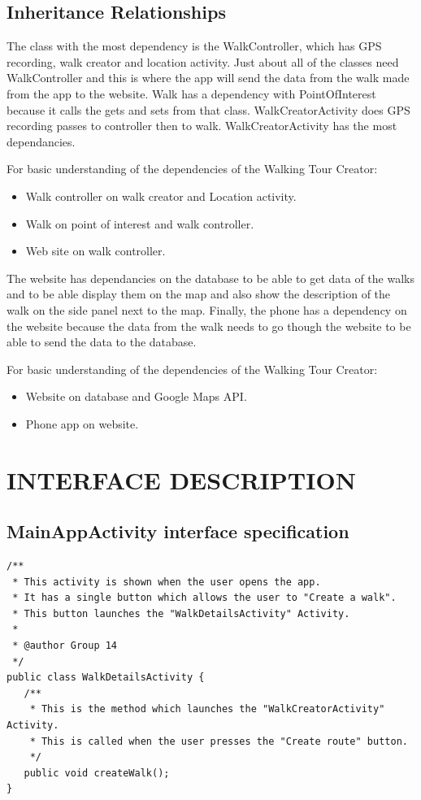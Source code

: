\documentclass{project}
\begin{document}
\newpage

\subsection{Inheritance Relationships}
The class with the most dependency is the WalkController, which has GPS
recording, walk creator and location activity. Just about all of the classes
need WalkController and this is where the app will send the data from the walk
made from the app to the website. Walk has a dependency with PointOfInterest
because it calls the gets and sets from that class. WalkCreatorActivity does GPS recording passes to controller then to walk. WalkCreatorActivity has the most dependancies.

For basic understanding of the dependencies of the Walking Tour Creator:
\begin{itemize}
\item Walk controller on walk creator and Location activity.
\item Walk on point of interest and walk controller.
\item Web site on walk controller.
\end{itemize}

The website has dependancies on the database to be able to get data of the
walks and to be able display them on the map and also show the description of
the walk on the side panel next to the map. Finally, the phone has a dependency
on the website because the data from the walk needs to go though the website to
be able to send the data to the database.      

For basic understanding of the dependencies of the Walking Tour Creator:
\begin{itemize}
\item Website on database and Google Maps API.
\item Phone app on website. 
\end{itemize}

\newpage

\section{INTERFACE DESCRIPTION}
\subsection{MainAppActivity interface specification}
\begin{verbatim}/**
 * This activity is shown when the user opens the app.
 * It has a single button which allows the user to "Create a walk". 
 * This button launches the "WalkDetailsActivity" Activity.
 *
 * @author Group 14
 */
public class WalkDetailsActivity {
   /**
    * This is the method which launches the "WalkCreatorActivity" Activity.
    * This is called when the user presses the "Create route" button.
    */
   public void createWalk();
}\end{verbatim}
\end{document}
